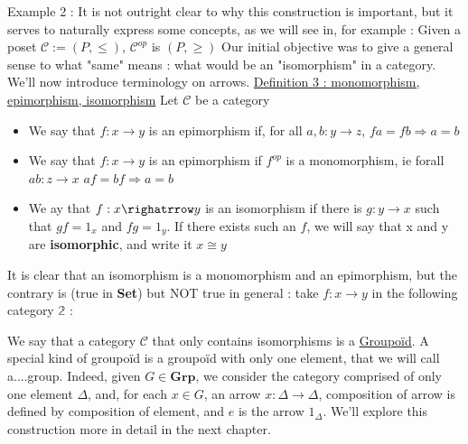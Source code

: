 \documentclass{article}
\begin{document}
\newline \noindent Example 2 : It is not outright clear to why this construction is important, but it serves to naturally express some concepts, as we will see in, for example : 
\newline \noindent Given a poset $\mathcal C := (P, \leq)$, $\mathcal{C}^{op}$ is $(P, \geq)$
\newline \newline
Our initial objective was to give a general sense to what "same" means : what would be an "isomorphism" in a category. We'll now introduce terminology on arrows.
\newline \noindent \newline
\noindent \large \underline{Definition 3 : monomorphism, epimorphism, isomorphism} \normalsize  \newline Let $\mathcal{C}$  be a category \newline
\begin{itemize}[noitemsep]
\item We say that $f : x \rightarrow y$ is an epimorphism if, for all $a, b : y \rightarrow z$, $fa = fb \Rightarrow a = b$
\item We say that $f : x \rightarrow y $ is an epimorphism if $f^{op}$ is a monomorphism, ie forall $a b : z \rightarrow x$ $af = bf \Rightarrow a = b$
\item We ay that $f : x \righatrrow y $ is an isomorphism if there is $g : y \rightarrow x$ such that $gf = 1_x$ and $fg = 1_y$. If there exists such an $f$, we will say that x and y are \textbf{isomorphic}, and write it $x \cong y$
\end{itemize}
\newline \noindent
It is clear that an isomorphism is a monomorphism and an epimorphism, but the contrary is (true in \textbf{Set}) but NOT true in general : take $f : x \rightarrow y$ in the following category $\mathbb{2}$ : \newline \newline
{}

\newline  
\newline
\noindent

\noindent We say that a category $\mathcal{C}$ that only contains isomorphisms is a \underline{Groupoïd}. \newline
A special kind of groupoïd is a groupoïd with only one element, that we will call a....group. \newline
Indeed, given $G \in \textbf{Grp}$, we consider the category comprised of only one element $\Delta$, and, for each $x \in G$, an arrow $x : \Delta \rightarrow \Delta$, composition of arrow is defined by composition of element, and $e$ is the arrow $1_\Delta$. \newline 
We'll explore this construction more in detail in the next chapter.
\newline
\end{document}

